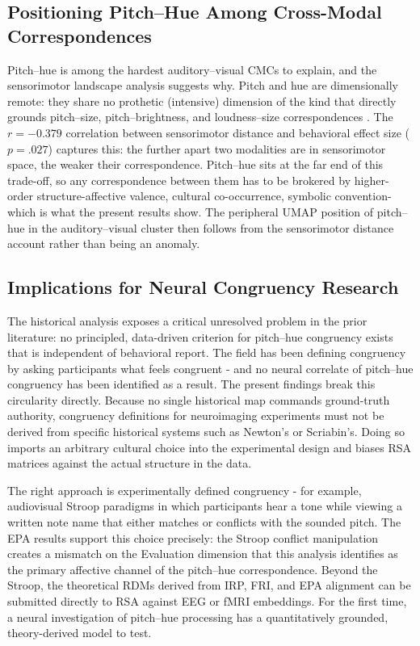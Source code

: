 \documentclass[12pt]{article}
\begin{document}
\subsection{Positioning Pitch--Hue Among Cross-Modal Correspondences}

Pitch--hue is among the hardest auditory--visual CMCs to explain, and
the sensorimotor landscape analysis suggests why. Pitch and hue are
dimensionally remote: they share no prothetic (intensive) dimension of
the kind that directly grounds pitch--size, pitch--brightness, and
loudness--size correspondences \citep{marks1978,walsh2003}. The
$r = -0.379$ correlation between sensorimotor distance and behavioral
effect size ($p = .027$) captures this: the further apart two modalities
are in sensorimotor space, the weaker their correspondence. Pitch--hue
sits at the far end of this trade-off, so any correspondence between
them has to be brokered by higher-order structure-affective valence,
cultural co-occurrence, symbolic convention-which is what the present
results show. The peripheral UMAP position of pitch--hue in the
auditory--visual cluster then follows from the sensorimotor distance
account rather than being an anomaly.

\subsection{Implications for Neural Congruency Research}

The historical analysis exposes a critical unresolved problem in the
prior literature: no principled, data-driven criterion for pitch--hue
congruency exists that is independent of behavioral report. The field
has been defining congruency by asking participants what feels
congruent - and no neural correlate of pitch--hue congruency has been
identified as a result. The present findings break this circularity
directly. Because no single historical map commands ground-truth
authority, congruency definitions for neuroimaging experiments must not
be derived from specific historical systems such as Newton's or
Scriabin's. Doing so imports an arbitrary cultural choice into the
experimental design and biases RSA matrices against the actual
structure in the data.

The right approach is experimentally defined congruency - for example,
audiovisual Stroop paradigms in which participants hear a tone while
viewing a written note name that either matches or conflicts with the
sounded pitch. The EPA results support this choice precisely: the
Stroop conflict manipulation creates a mismatch on the Evaluation
dimension that this analysis identifies as the primary
affective channel of the pitch--hue correspondence. Beyond the Stroop,
the theoretical RDMs derived from IRP, FRI, and EPA alignment can be
submitted directly to RSA against EEG or fMRI embeddings. For the
first time, a neural investigation of pitch--hue processing has a
quantitatively grounded, theory-derived model to test.
\end{document}
